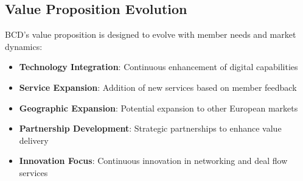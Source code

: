 \subsection{Value Proposition Evolution}

BCD's value proposition is designed to evolve with member needs and market dynamics:

\begin{itemize}
    \item \textbf{Technology Integration}: Continuous enhancement of digital capabilities
    \item \textbf{Service Expansion}: Addition of new services based on member feedback
    \item \textbf{Geographic Expansion}: Potential expansion to other European markets
    \item \textbf{Partnership Development}: Strategic partnerships to enhance value delivery
    \item \textbf{Innovation Focus}: Continuous innovation in networking and deal flow services
\end{itemize}

